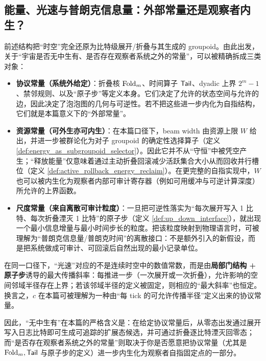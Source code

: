 \subsection{能量、光速与普朗克信息量：外部常量还是观察者内生？}\label{subsec:constants_or_internal}
前述结构把“时空”完全还原为比特级展开/折叠与其生成的 groupoid。由此出发，关于“宇宙是否无中生有、是否存在观察者系统之外的常量”，可以被精确拆成三类对象：
\begin{itemize}
  \item \textbf{协议常量（系统外给定）}：折叠核 \(\mathrm{Fold}_m\)、时间算子 \(\mathsf{Tail}\)、dyadic 上界 \(2^m-1\)、禁邻规则、以及“原子步”等定义本身。它们决定了允许的状态空间与允许的边，因此决定了泡泡图的几何与可逆性。若不把这些进一步内化为自指结构，它们就是本篇意义下的“外部常量”。
  \item \textbf{资源常量（可外生亦可内生）}：在本篇口径下，beam width 由资源上限 \(W\) 给出，并进一步被群论化为对子 groupoid 的确定性选择算子（定义 \ref{def:energy_as_subgroupoid_selector}）。因此它并不从“守恒”中被凭空产生；“释放能量”仅意味着通过主动折叠回滚减少活跃集合大小从而回收并行槽位（定义 \ref{def:active_rollback_energy_reclaim}）。在更完整的自指实现中，\(W\) 也可以被内生化为观察者内部可审计寄存器（例如可用缓冲与可逆计算深度）所允许的上界函数。
  \item \textbf{尺度常量（来自离散可审计粒度）}：一旦把可逆性落实为“每次展开写入 1 比特、每次折叠湮灭 1 比特”的原子步（定义 \ref{def:up_down_interface}），就出现一个最小信息增量与最小时间步长的粒度。把该粒度映射到物理语言时，可被理解为“普朗克信息量/普朗克时间”的离散接口：不是额外引入的新假设，而是把系统做成可审计、可回滚后自然出现的最小记录单位。
\end{itemize}

在同一口径下，“光速”对应的不是连续时空中的数值常数，而是由\textbf{局部门结构 + 原子步}诱导的最大传播斜率：每推进一步（一次展开或一次折叠），允许影响的空间邻域半径存在上界；若该邻域半径的定义被固定，则相应的“最大斜率”也恒定。换言之，\(c\) 在本篇可被理解为一种由“每 tick 的可允许传播半径”定义出来的协议常量。

因此，“无中生有”在本篇的严格含义是：在给定协议常量后，从零态出发通过展开写入日志比特即可生成可追踪的扩展态候选，并可通过折叠逐比特湮灭回零态；而“是否存在观察者系统之外的常量”则取决于你是否愿意把协议常量（尤其是 \(\mathrm{Fold}_m,\mathsf{Tail}\) 与原子步的定义）进一步内生化为观察者自指固定点的一部分。

